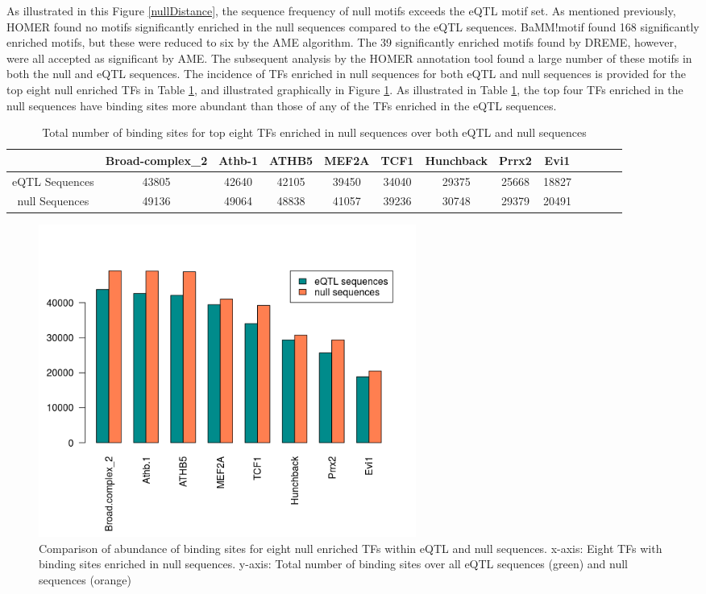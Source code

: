 \documentclass[12pt]{article}
\begin{document}
As illustrated in this Figure  \ref{nullDistance}, the sequence frequency of null motifs exceeds the eQTL motif set. As mentioned previously, HOMER found no motifs significantly enriched in the null sequences compared to the eQTL sequences. BaMM!motif found 168 significantly enriched motifs, but these were reduced to six by the AME algorithm. The 39 significantly enriched motifs found by DREME, however, were all accepted as significant by AME. The subsequent analysis by the HOMER annotation tool found a large number of these motifs in both the null and eQTL sequences. The incidence of TFs enriched in null sequences for both eQTL and null sequences is provided for the top eight null enriched TFs in Table \ref{TFnosNull}, and illustrated graphically in Figure \ref{TFnulls}. As illustrated in Table \ref{TFnosNull}, the top four TFs enriched in the null sequences have binding sites more abundant than those of any of the TFs enriched in the eQTL sequences.


\begin{table}[!htbp]
\caption{Total number of binding sites for top eight TFs enriched in null sequences over both eQTL and null sequences}
\label{TFnosNull}
\centering
\begin{tabular}{ccccccccccccc}
\toprule[0.2em]
&Broad-complex{\_}2&Athb-1&ATHB5&MEF2A&TCF1&Hunchback&Prrx2&Evi1\\
\midrule[0.1em]
eQTL Sequences&43805&42640&42105&39450&34040&29375&25668&18827\\
null Sequences&49136&49064&48838&41057&39236&30748&29379&20491\\
 \bottomrule[0.2em]
\end{tabular}
\end{table}

\begin{figure}[!htbp]
\centering
\includegraphics[width= 0.6\textwidth]{RplotNullMotifComparison.png} 
\caption{Comparison of abundance of binding sites for eight null enriched TFs within eQTL and null sequences. x-axis: Eight TFs with binding sites enriched in null sequences. y-axis: Total number of binding sites over all eQTL sequences (green) and null sequences (orange)} 
\label{TFnulls}
\end{figure}
\end{document}
